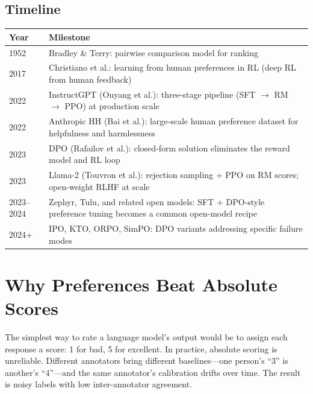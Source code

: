 \subsection*{Timeline}

\begin{center}
\begin{tabularx}{\textwidth}{@{}lX@{}}
\toprule
\textbf{Year} & \textbf{Milestone} \\
\midrule
1952 & Bradley \& Terry: pairwise comparison model for ranking \\
2017 & Christiano et al.: learning from human preferences in RL (deep RL from human feedback) \\
2022 & InstructGPT (Ouyang et al.): three-stage pipeline (SFT $\to$ RM $\to$ PPO) at production scale \\
2022 & Anthropic HH (Bai et al.): large-scale human preference dataset for helpfulness and harmlessness \\
2023 & DPO (Rafailov et al.): closed-form solution eliminates the reward model and RL loop \\
2023 & Llama-2 (Touvron et al.): rejection sampling + PPO on RM scores; open-weight RLHF at scale \\
2023--2024 & Zephyr, Tulu, and related open models: SFT + DPO-style preference tuning becomes a common open-model recipe \\
2024+ & IPO, KTO, ORPO, SimPO: DPO variants addressing specific failure modes \\
\bottomrule
\end{tabularx}
\end{center}



\section{Why Preferences Beat Absolute Scores}
\label{sec:why-preferences}

The simplest way to rate a language model's output would be to assign each response a score: 1 for bad, 5 for excellent. In practice, absolute scoring is unreliable. Different annotators bring different baselines---one person's ``3'' is another's ``4''---and the same annotator's calibration drifts over time. The result is noisy labels with low inter-annotator agreement.

